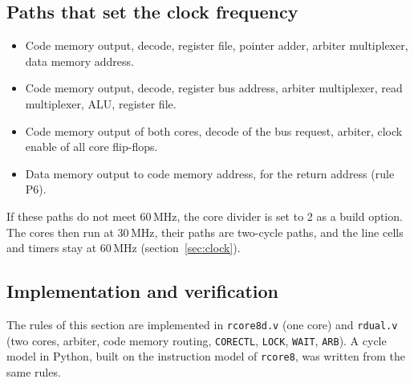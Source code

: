 \documentclass[10pt,a4paper]{article}
\newcommand{\reg}[1]{\texttt{#1}}
\begin{document}
\subsection{Paths that set the clock frequency}

\begin{itemize}
\item Code memory output, decode, register file, pointer adder, arbiter multiplexer, data memory address.
\item Code memory output, decode, register bus address, arbiter multiplexer, read multiplexer, ALU, register
file.
\item Code memory output of both cores, decode of the bus request, arbiter, clock enable of all core
flip-flops.
\item Data memory output to code memory address, for the return address (rule P6).
\end{itemize}

If these paths do not meet 60\,MHz, the core divider is set to 2 as a build option. The cores then run at
30\,MHz, their paths are two-cycle paths, and the line cells and timers stay at 60\,MHz
(section~\ref{sec:clock}).

\subsection{Implementation and verification}\label{sec:corever}

The rules of this section are implemented in \texttt{rcore8d.v} (one core) and \texttt{rdual.v} (two cores,
arbiter, code memory routing, \reg{CORECTL}, \reg{LOCK}, \reg{WAIT}, \reg{ARB}). A cycle model in Python,
built on the instruction model of \texttt{rcore8}, was written from the same rules.
\end{document}
